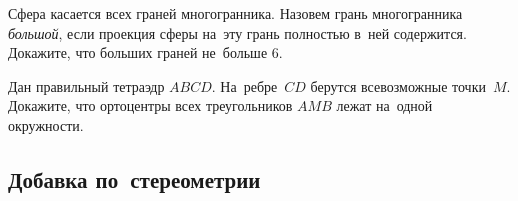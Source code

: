 \begin{problems}
\item
Сфера касается всех граней многогранника.
Назовем грань многогранника \emph{большой}, если проекция сферы на~эту грань
полностью в~ней содержится.
Докажите, что больших граней не~больше 6.

\item
Дан правильный тетраэдр $ABCD$.
На~ребре~$CD$ берутся всевозможные точки~$M$.
Докажите, что ортоцентры всех треугольников $AMB$ лежат на~одной окружности.

\end{problems}



\iffalse

\subsection*{Добавка по~стереометрии}

